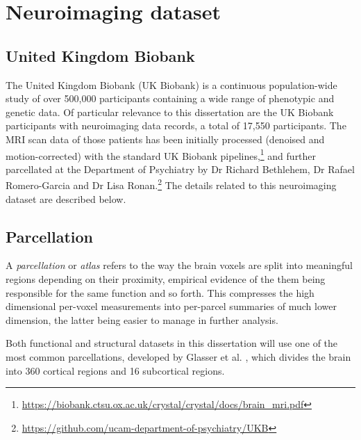\section{Neuroimaging dataset}
\label{dataset}

\subsection{United Kingdom Biobank}

The United Kingdom Biobank (UK Biobank) \cite{sudlow2015uk} is a continuous population-wide study of over 500,000 participants containing a wide range of phenotypic and genetic data. 
Of particular relevance to this dissertation are the UK Biobank participants with neuroimaging data records, a total of 17,550 participants.
The MRI scan data of those patients has been initially processed (denoised and motion-corrected) with the standard UK Biobank pipelines,\footnote{\url{https://biobank.ctsu.ox.ac.uk/crystal/crystal/docs/brain_mri.pdf}} and further parcellated at the Department of Psychiatry by Dr Richard Bethlehem, Dr Rafael Romero-Garcia and Dr Lisa Ronan.\footnote{\url{https://github.com/ucam-department-of-psychiatry/UKB}} The details related to this neuroimaging dataset are described below.

\subsection{Parcellation}
A \textit{parcellation} or \textit{atlas} refers to the way the brain voxels are split into meaningful regions depending on their proximity, empirical evidence of the them being responsible for the same function and so forth. This compresses the high dimensional per-voxel measurements into per-parcel summaries of much lower dimension, the latter being easier to manage in further analysis.


Both functional and structural datasets in this dissertation will use one of the most common parcellations, developed by Glasser et al. \cite{glasser2016multi}, which divides the brain into 360 cortical regions and 16 subcortical regions. 


